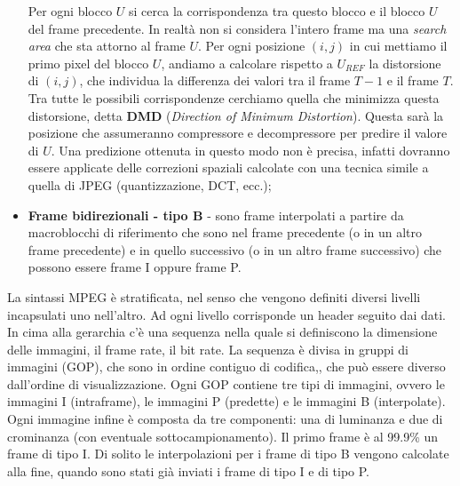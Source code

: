 \begin{itemize}
    Per ogni blocco \(U\) si cerca la corrispondenza tra questo blocco e il blocco \(U\) del frame precedente. In realtà non si considera l'intero frame ma una \textit{search area} che sta attorno al frame \(U\). Per ogni posizione \((i,j)\) in cui mettiamo il primo pixel del blocco \(U\), andiamo a calcolare rispetto a \(U_{REF}\) la distorsione di \((i,j)\), che individua la differenza dei valori tra il frame \(T-1\) e il frame \(T\). Tra tutte le possibili corrispondenze cerchiamo quella che minimizza questa distorsione, detta \textbf{DMD} (\textit{Direction of Minimum Distortion}). Questa sarà la posizione che assumeranno compressore e decompressore per predire il valore di \(U\). Una predizione ottenuta in questo modo non è precisa, infatti dovranno essere applicate delle correzioni spaziali calcolate con una tecnica simile a quella di JPEG (quantizzazione, DCT, ecc.);
    \item \textbf{Frame bidirezionali - tipo B} - sono frame interpolati a partire da macroblocchi di riferimento che sono nel frame precedente (o in un altro frame precedente) e in quello successivo (o in un altro frame successivo) che possono essere frame I oppure frame P.
\end{itemize}

La sintassi MPEG è stratificata, nel senso che vengono definiti diversi livelli incapsulati uno nell'altro. Ad ogni livello corrisponde un header seguito dai dati. In cima alla gerarchia c'è una sequenza nella quale si definiscono la dimensione delle immagini, il frame rate, il bit rate. La sequenza è divisa in gruppi di immagini (GOP), che sono in ordine contiguo di codifica,, che può essere diverso dall'ordine di visualizzazione. Ogni GOP contiene tre tipi di immagini, ovvero le immagini I (intraframe), le immagini P (predette) e le immagini B (interpolate). Ogni immagine infine è composta da tre componenti: una di luminanza e due di crominanza (con eventuale sottocampionamento). Il primo frame è al 99.9\% un frame di tipo I. Di solito le interpolazioni per i frame di tipo B vengono calcolate alla fine, quando sono stati già inviati i frame di tipo I e di tipo P. 

\begin{figure}[htbp!]
    \centering
    
\end{figure}
\FloatBarrier


